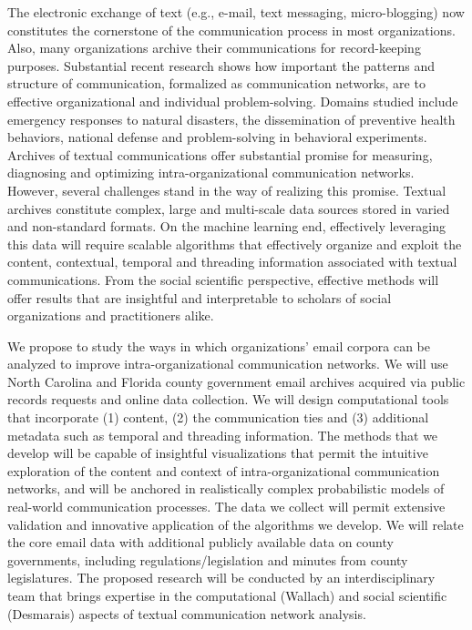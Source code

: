 


\noindent The electronic exchange of text (e.g., e-mail, text messaging, micro-blogging) now constitutes the cornerstone of the communication process in most organizations. Also, many organizations archive their communications for record-keeping purposes. Substantial recent research shows how important the patterns and structure of communication, formalized as communication networks, are to effective organizational and individual problem-solving. Domains studied include emergency responses to natural disasters, the dissemination of preventive health behaviors, national defense and problem-solving in  behavioral experiments. Archives of textual communications offer substantial promise for measuring, diagnosing and optimizing intra-organizational communication networks. However, several challenges stand in the way of realizing this promise. Textual archives constitute complex, large  and multi-scale data sources stored in varied and non-standard formats. On the machine learning end, effectively leveraging this data will require scalable algorithms that effectively organize and exploit the content, contextual, temporal and threading information associated with textual communications. From the social scientific perspective, effective methods will offer results that are insightful and interpretable to scholars of social organizations and practitioners alike. \vspace{.25cm}


 We propose to study the ways in which organizations' email corpora can be analyzed to improve intra-organizational communication networks. We will use North Carolina and Florida county government email archives acquired via public records requests and online data collection. We will design computational tools that incorporate (1) content, (2) the communication ties and (3) additional metadata such as temporal and threading information.  The methods that we develop will be capable of insightful visualizations that permit the intuitive exploration of the content and context of intra-organizational communication networks, and will be anchored in realistically complex probabilistic models of real-world communication processes.  The data we collect will permit extensive validation and innovative application of the algorithms we develop. We will relate the core email data with additional publicly available data on county governments, including regulations/legislation and minutes from county legislatures. The proposed research will be conducted by an interdisciplinary team that brings expertise in the computational (Wallach) and social scientific (Desmarais) aspects of textual communication network analysis.\vspace{.25cm}


